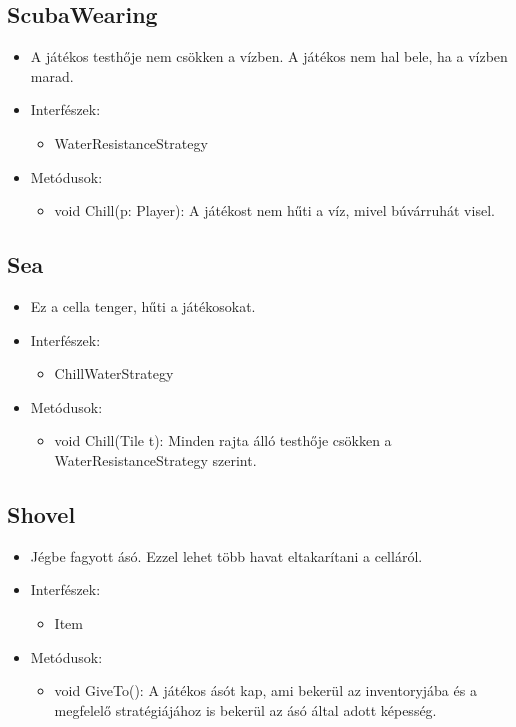 \subsection{ScubaWearing}
\begin{itemize}
	\item A játékos testhője nem csökken a vízben. A játékos nem hal bele, ha a vízben marad.
	\item Interfészek:
	\begin{itemize}
		\item WaterResistanceStrategy
	\end{itemize}
	\item Metódusok:
	\begin{itemize}
		\item void Chill(p: Player): A játékost nem hűti a víz, mivel búvárruhát visel.
	\end{itemize}
\end{itemize}

\subsection{Sea}
\begin{itemize}
		\item Ez a cella tenger, hűti a játékosokat.
	\item Interfészek:
	\begin{itemize}
		\item ChillWaterStrategy
	\end{itemize}
	\item Metódusok:
	\begin{itemize}
		\item void Chill(Tile t): Minden rajta álló testhője csökken a WaterResistanceStrategy szerint.
	\end{itemize}
\end{itemize}

\subsection{Shovel}
\begin{itemize}
	\item Jégbe fagyott ásó. Ezzel lehet több havat eltakarítani a celláról.
	\item Interfészek:
	\begin{itemize}
		\item Item
	\end{itemize}
	\item Metódusok:
	\begin{itemize}
		\item void GiveTo(): A játékos ásót kap, ami bekerül az inventoryjába és a megfelelő stratégiájához is bekerül az ásó által adott képesség.
	\end{itemize}
\end{itemize}

